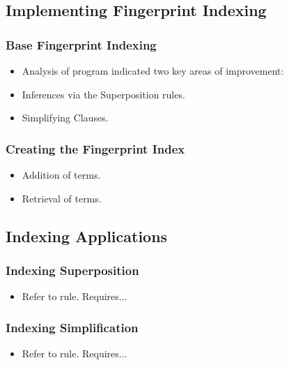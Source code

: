 \documentclass[10pt]{beamer}
\begin{document}
\begin{NoHyper}
\subsection{Implementing Fingerprint Indexing}
\begin{frame}
  \frametitle{Base Fingerprint Indexing}
  \begin{itemize}
  \item<1-> Analysis of program indicated two key areas of improvement:
  \item<2-> Inferences via the Superposition rules.
  \item<2-> Simplifying Clauses.
  \end{itemize}
\end{frame}

\begin{frame}
  \frametitle{Creating the Fingerprint Index}
  \begin{itemize}
  \item<1-> Addition of terms.
  \item<2-> Retrieval of terms.
  \end{itemize}
\end{frame}

\subsection{Indexing Applications}
\begin{frame}
  \frametitle{Indexing Superposition}
  \begin{itemize}
  \item<1-> Refer to rule. Requires...
  \end{itemize}
\end{frame}

\begin{frame}
  \frametitle{Indexing Simplification}
  \begin{itemize}
  \item<1-> Refer to rule. Requires...
  \end{itemize}
\end{frame}


\end{NoHyper}
\end{document}
